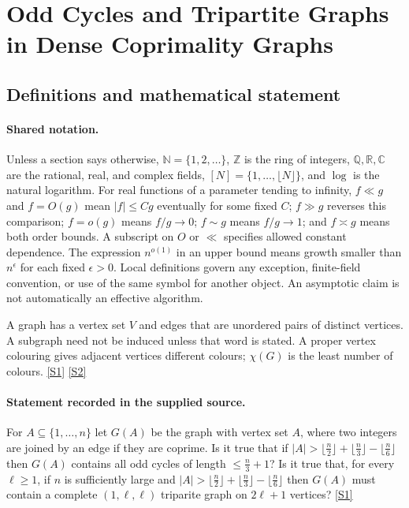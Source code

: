 \documentclass[11pt,a4paper]{article}
\newcommand{\N}{\mathbb{N}}
\newcommand{\Z}{\mathbb{Z}}
\newcommand{\Q}{\mathbb{Q}}
\newcommand{\R}{\mathbb{R}}
\newcommand{\C}{\mathbb{C}}
\newcommand{\sref}[2]{\hyperlink{source:#1:#2}{[S#2]}}
\begin{document}
\section{Odd Cycles and Tripartite Graphs in Dense Coprimality Graphs}\label{statement}


\subsection{Definitions and mathematical statement}

\paragraph{Shared notation.}Unless a section says otherwise, $\N=\{1,2,\ldots\}$,
$\Z$ is the ring of integers, $\Q,\R,\C$ are the rational, real, and complex
fields, $[N]=\{1,\ldots,\lfloor N\rfloor\}$, and $\log$ is the natural
logarithm. For real functions of a parameter tending to infinity,
$f\ll g$ and $f=O(g)$ mean $|f|\leq Cg$ eventually for some fixed $C$;
$f\gg g$ reverses this comparison; $f=o(g)$ means $f/g\to0$;
$f\sim g$ means $f/g\to1$; and $f\asymp g$ means both order bounds.
A subscript on $O$ or $\ll$ specifies allowed constant dependence.
The expression $n^{o(1)}$ in an upper bound means growth smaller than
$n^\epsilon$ for each fixed $\epsilon>0$. Local definitions govern any
exception, finite-field convention, or use of the same symbol for another
object. An asymptotic claim is not automatically an effective algorithm.



A graph has a vertex set $V$ and edges that are unordered pairs of distinct vertices. A subgraph need not be induced unless that word is stated. A proper vertex colouring gives adjacent vertices different colours; $\chi(G)$ is the least number of colours. \sref{statement}{1} \sref{statement}{2}

\paragraph{Statement recorded in the supplied source.}
For $A\subseteq \{1,\ldots,n\}$ let $G(A)$ be the graph with vertex set $A$, where two integers are joined by an edge if they are coprime.
Is it true that if $ \lvert A\rvert >\lfloor\tfrac{n}{2}\rfloor+\lfloor\tfrac{n}{3}\rfloor-\lfloor\tfrac{n}{6}\rfloor $ then $G(A)$ contains all odd cycles of length $\leq \frac{n}{3}+1$?
Is it true that, for every $\ell\geq 1$, if $n$ is sufficiently large and $ \lvert A\rvert >\lfloor\tfrac{n}{2}\rfloor+\lfloor\tfrac{n}{3}\rfloor-\lfloor\tfrac{n}{6}\rfloor $ then $G(A)$ must contain a complete $(1,\ell,\ell)$ triparite graph on $2\ell+1$ vertices? \sref{statement}{1}
\end{document}
